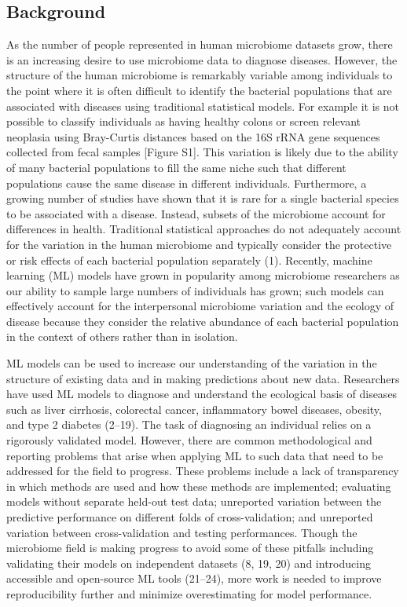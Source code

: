\documentclass[
  11pt,
]{article}
\begin{document}
\newpage

\hypertarget{background}{%
\subsection{Background}\label{background}}

As the number of people represented in human microbiome datasets grow,
there is an increasing desire to use microbiome data to diagnose
diseases. However, the structure of the human microbiome is remarkably
variable among individuals to the point where it is often difficult to
identify the bacterial populations that are associated with diseases
using traditional statistical models. For example it is not possible to
classify individuals as having healthy colons or screen relevant
neoplasia using Bray-Curtis distances based on the 16S rRNA gene
sequences collected from fecal samples {[}Figure S1{]}. This variation
is likely due to the ability of many bacterial populations to fill the
same niche such that different populations cause the same disease in
different individuals. Furthermore, a growing number of studies have
shown that it is rare for a single bacterial species to be associated
with a disease. Instead, subsets of the microbiome account for
differences in health. Traditional statistical approaches do not
adequately account for the variation in the human microbiome and
typically consider the protective or risk effects of each bacterial
population separately (1). Recently, machine learning (ML) models have
grown in popularity among microbiome researchers as our ability to
sample large numbers of individuals has grown; such models can
effectively account for the interpersonal microbiome variation and the
ecology of disease because they consider the relative abundance of each
bacterial population in the context of others rather than in isolation.

ML models can be used to increase our understanding of the variation in
the structure of existing data and in making predictions about new data.
Researchers have used ML models to diagnose and understand the
ecological basis of diseases such as liver cirrhosis, colorectal cancer,
inflammatory bowel diseases, obesity, and type 2 diabetes (2--19). The
task of diagnosing an individual relies on a rigorously validated model.
However, there are common methodological and reporting problems that
arise when applying ML to such data that need to be addressed for the
field to progress. These problems include a lack of transparency in
which methods are used and how these methods are implemented; evaluating
models without separate held-out test data; unreported variation between
the predictive performance on different folds of cross-validation; and
unreported variation between cross-validation and testing performances.
Though the microbiome field is making progress to avoid some of these
pitfalls including validating their models on independent datasets (8,
19, 20) and introducing accessible and open-source ML tools (21--24),
more work is needed to improve reproducibility further and minimize
overestimating for model performance.
\end{document}
